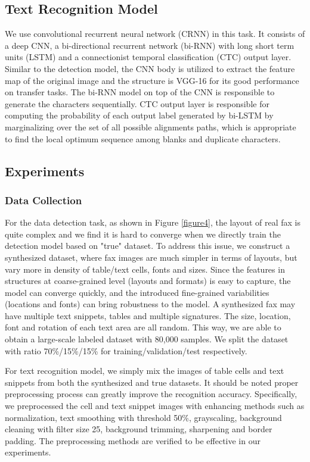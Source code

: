 \documentclass[sigconf]{acmart}
\begin{document}
\subsection{Text Recognition Model}
We use convolutional recurrent neural network (CRNN) \cite{shi2017end} in this task. It consists of a deep CNN, a bi-directional recurrent network (bi-RNN) with long short term units (LSTM) and a connectionist temporal classification (CTC) \cite{graves2006connectionist} output layer. Similar to the detection model, the CNN body is utilized to extract the feature map of the original image and the structure is VGG-16 for its good performance on transfer tasks. The bi-RNN model on top of the CNN is responsible to generate the characters sequentially. CTC output layer is responsible for computing the probability of each output label generated by bi-LSTM by marginalizing over the set of all possible alignments paths, which is appropriate to find the local optimum sequence among blanks and duplicate characters.

\subsection{Experiments}
\subsubsection*{\rm \textbf{Data Collection}}
For the data detection task, as shown in Figure \ref{figure4}, the layout of real fax is quite complex and we find it is hard to converge when we directly train the detection model based on "true" dataset. To address this issue, we construct a synthesized dataset, where fax images are much simpler in terms of layouts, but vary more in density of table/text cells, fonts and sizes. Since the features in structures at coarse-grained level (layouts and formats) is easy to capture, the model can converge quickly, and the introduced fine-grained variabilities (locations and fonts) can bring robustness to the model. A synthesized fax may have multiple text snippets, tables and multiple signatures. The size, location, font and rotation of each text area are all random. This way, we are able to obtain a large-scale labeled dataset with 80,000 samples. We split the dataset with ratio 70\%/15\%/15\% for training/validation/test respectively. 

For text recognition model, we simply mix the images of table cells and text snippets from both the synthesized and true datasets. It should be noted proper preprocessing process can greatly improve the recognition accuracy. Specifically, we preprocessed the cell and text snippet images with enhancing methods such as normalization, text smoothing with threshold 50\%, grayscaling, background cleaning with filter size 25, background trimming, sharpening and border padding. The preprocessing methods are verified to be effective in our experiments.
\end{document}
